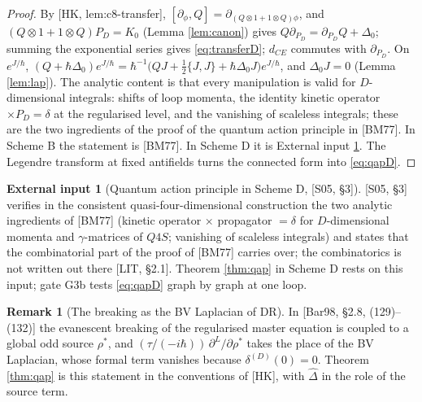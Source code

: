 \documentclass[11pt]{article}
\theoremstyle{definition}
\newtheorem{remark}[definition]{Remark}
\newtheorem{axiom}[definition]{External input}
\numberwithin{equation}{section}
\begin{document}
\begin{proof}
By [HK, lem:c8-transfer], $[\partial_\phi,Q]=\partial_{(Q\otimes1+1\otimes Q)\phi}$, and $(Q\otimes1+1\otimes Q)P_D=K_0$ (Lemma \ref{lem:canon}) gives $Q\partial_{P_D}=\partial_{P_D}Q+\Delta_0$; summing the exponential series gives \eqref{eq:transferD}; $d_{CE}$ commutes with $\partial_{P_D}$. On $e^{J/\hbar}$, $(Q+\hbar\Delta_0)e^{J/\hbar}=\hbar^{-1}\big(QJ+\frac12\{J,J\}+\hbar\Delta_0J\big)e^{J/\hbar}$, and $\Delta_0J=0$ (Lemma \ref{lem:lap}). The analytic content is that every manipulation is valid for $D$-dimensional integrals: shifts of loop momenta, the identity kinetic operator $\times P_D=\delta$ at the regularised level, and the vanishing of scaleless integrals; these are the two ingredients of the proof of the quantum action principle in [BM77]. In Scheme B the statement is [BM77]. In Scheme D it is External input \ref{ax:qapD}. The Legendre transform at fixed antifields turns the connected form into \eqref{eq:qapD}.
\end{proof}

\begin{axiom}[Quantum action principle in Scheme D, {[S05, §3]}]
\label{ax:qapD}
[S05, §3] verifies in the consistent quasi-four-dimensional construction the two analytic ingredients of [BM77] (kinetic operator $\times$ propagator $=\delta$ for $D$-dimensional momenta and $\gamma$-matrices of $Q4S$; vanishing of scaleless integrals) and states that the combinatorial part of the proof of [BM77] carries over; the combinatorics is not written out there [LIT, §2.1]. Theorem \ref{thm:qap} in Scheme D rests on this input; gate G3b tests \eqref{eq:qapD} graph by graph at one loop.
\end{axiom}

\begin{remark}[The breaking as the BV Laplacian of DR]
In [Bar98, §2.8, (129)--(132)] the evanescent breaking of the regularised master equation is coupled to a global odd source $\rho^*$, and $(\tau/(-i\hbar))\,\partial^L/\partial\rho^*$ takes the place of the BV Laplacian, whose formal term vanishes because $\delta^{(D)}(0)=0$. Theorem \ref{thm:qap} is this statement in the conventions of [HK], with $\widehat\Delta$ in the role of the source term.
\end{remark}
\end{document}
